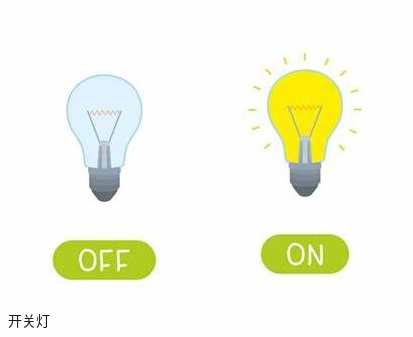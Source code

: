 \documentclass[12pt]{ctexart} %
\begin{document}
\begin{figure}[h]
\centering
\includegraphics[scale=.5]{figures/off.png}
\includegraphics[scale=0.5]{figures/on.png}
\caption{开关灯}
\end{figure}
\end{document}
